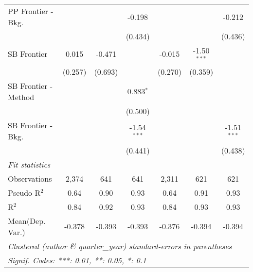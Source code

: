\begin{tabular}{lcccccc}
   PP Frontier - Bkg.   &              &         & -0.198        &               &               & -0.212\\   
                        &              &         & (0.434)       &               &               & (0.436)\\   
   SB Frontier          & 0.015        & -0.471  &               & -0.015        & -1.50$^{***}$ &   \\   
                        & (0.257)      & (0.693) &               & (0.270)       & (0.359)       &   \\   
   SB Frontier - Method &              &         & 0.883$^{*}$   &               &               &   \\   
                        &              &         & (0.500)       &               &               &   \\   
   SB Frontier - Bkg.   &              &         & -1.54$^{***}$ &               &               & -1.51$^{***}$\\   
                        &              &         & (0.441)       &               &               & (0.438)\\   
   \midrule
   \emph{Fit statistics}\\
   Observations         & 2,374        & 641     & 641           & 2,311         & 621           & 621\\  
   Pseudo R$^2$         & 0.64         & 0.90    & 0.93          & 0.64          & 0.91          & 0.93\\  
   R$^2$                & 0.84         & 0.92    & 0.93          & 0.84          & 0.93          & 0.93\\  
Mean(Dep. Var.) & -0.378 & -0.393 & -0.393 & -0.376 & -0.394 & -0.394 \\
   \midrule \midrule
   \multicolumn{7}{l}{\emph{Clustered (author \& quarter\_year) standard-errors in parentheses}}\\
   \multicolumn{7}{l}{\emph{Signif. Codes: ***: 0.01, **: 0.05, *: 0.1}}\\
\end{tabular}
\par\endgroup
